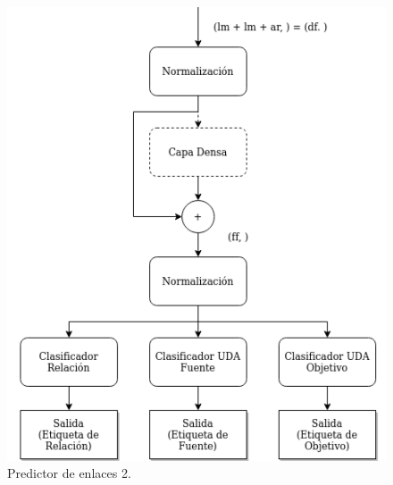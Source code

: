 \begin{figure}[p]
    \begin{center}
        \includegraphics[scale=.4]{Graphics/Modelo_Link_Prediction2.png}
    \end{center}
    \caption{Predictor de enlaces 2.}\label{fig:link_predictor_model2}
\end{figure}
